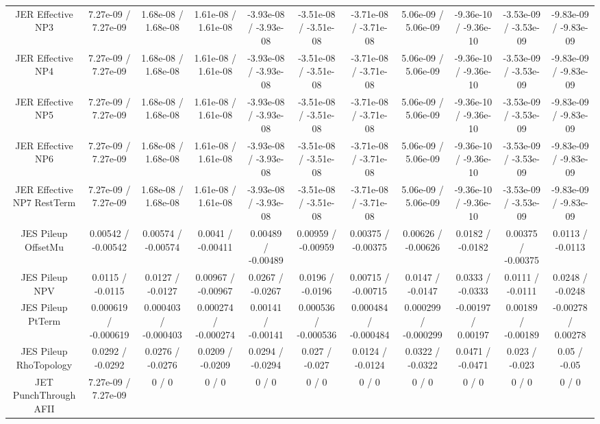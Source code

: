 \begin{table}[htbp]
\begin{center}
\begin{tabular}{|c|c|c|c|c|c|c|c|c|c|c|}
  JER Effective NP3 & 7.27e-09 / 7.27e-09 & 1.68e-08 / 1.68e-08 & 1.61e-08 / 1.61e-08 & -3.93e-08 / -3.93e-08 & -3.51e-08 / -3.51e-08 & -3.71e-08 / -3.71e-08 & 5.06e-09 / 5.06e-09 & -9.36e-10 / -9.36e-10 & -3.53e-09 / -3.53e-09 & -9.83e-09 / -9.83e-09 \\ 
  JER Effective NP4 & 7.27e-09 / 7.27e-09 & 1.68e-08 / 1.68e-08 & 1.61e-08 / 1.61e-08 & -3.93e-08 / -3.93e-08 & -3.51e-08 / -3.51e-08 & -3.71e-08 / -3.71e-08 & 5.06e-09 / 5.06e-09 & -9.36e-10 / -9.36e-10 & -3.53e-09 / -3.53e-09 & -9.83e-09 / -9.83e-09 \\ 
  JER Effective NP5 & 7.27e-09 / 7.27e-09 & 1.68e-08 / 1.68e-08 & 1.61e-08 / 1.61e-08 & -3.93e-08 / -3.93e-08 & -3.51e-08 / -3.51e-08 & -3.71e-08 / -3.71e-08 & 5.06e-09 / 5.06e-09 & -9.36e-10 / -9.36e-10 & -3.53e-09 / -3.53e-09 & -9.83e-09 / -9.83e-09 \\ 
  JER Effective NP6 & 7.27e-09 / 7.27e-09 & 1.68e-08 / 1.68e-08 & 1.61e-08 / 1.61e-08 & -3.93e-08 / -3.93e-08 & -3.51e-08 / -3.51e-08 & -3.71e-08 / -3.71e-08 & 5.06e-09 / 5.06e-09 & -9.36e-10 / -9.36e-10 & -3.53e-09 / -3.53e-09 & -9.83e-09 / -9.83e-09 \\ 
  JER Effective NP7 RestTerm & 7.27e-09 / 7.27e-09 & 1.68e-08 / 1.68e-08 & 1.61e-08 / 1.61e-08 & -3.93e-08 / -3.93e-08 & -3.51e-08 / -3.51e-08 & -3.71e-08 / -3.71e-08 & 5.06e-09 / 5.06e-09 & -9.36e-10 / -9.36e-10 & -3.53e-09 / -3.53e-09 & -9.83e-09 / -9.83e-09 \\ 
  JES Pileup OffsetMu & 0.00542 / -0.00542 & 0.00574 / -0.00574 & 0.0041 / -0.00411 & 0.00489 / -0.00489 & 0.00959 / -0.00959 & 0.00375 / -0.00375 & 0.00626 / -0.00626 & 0.0182 / -0.0182 & 0.00375 / -0.00375 & 0.0113 / -0.0113 \\ 
  JES Pileup NPV & 0.0115 / -0.0115 & 0.0127 / -0.0127 & 0.00967 / -0.00967 & 0.0267 / -0.0267 & 0.0196 / -0.0196 & 0.00715 / -0.00715 & 0.0147 / -0.0147 & 0.0333 / -0.0333 & 0.0111 / -0.0111 & 0.0248 / -0.0248 \\ 
  JES Pileup PtTerm & 0.000619 / -0.000619 & 0.000403 / -0.000403 & 0.000274 / -0.000274 & 0.00141 / -0.00141 & 0.000536 / -0.000536 & 0.000484 / -0.000484 & 0.000299 / -0.000299 & -0.00197 / 0.00197 & 0.00189 / -0.00189 & -0.00278 / 0.00278 \\ 
  JES Pileup RhoTopology & 0.0292 / -0.0292 & 0.0276 / -0.0276 & 0.0209 / -0.0209 & 0.0294 / -0.0294 & 0.027 / -0.027 & 0.0124 / -0.0124 & 0.0322 / -0.0322 & 0.0471 / -0.0471 & 0.023 / -0.023 & 0.05 / -0.05 \\ 
  JET PunchThrough AFII & 7.27e-09 / 7.27e-09 & 0 / 0 & 0 / 0 & 0 / 0 & 0 / 0 & 0 / 0 & 0 / 0 & 0 / 0 & 0 / 0 & 0 / 0 \\ 

\end{tabular}
\end{center}
\end{table}
